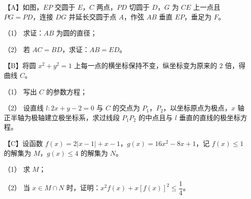\Needspace{0.4\textheight}
\begin{question}
【A】如图，$EP$ 交圆于 $E$，$C$ 两点，$PD$ 切圆于 $D$，$G$ 为 $CE$ 上一点且 $PG=PD$，连接 $DG$ 并延长交圆于点 $A$，作弦 $AB$ 垂直 $EP$，垂足为 $F$。
\nopagebreak[4]
\begin{center}\end{center}
\nopagebreak[4]
（1） 求证：$AB$ 为圆的直径；

（2） 若 $AC=BD$，求证：$AB=ED$。

\end{question}
\begin{question}
【B】将圆 $x^2+y^2=1$ 上每一点的横坐标保持不变，纵坐标变为原来的 $2$ 倍，得曲线 $C$。

（1） 写出 $C$ 的参数方程；

（2） 设直线 $l:2x+y-2=0$ 与 $C$ 的交点为 $P_1$，$P_2$，以坐标原点为极点，$x$ 轴正半轴为极轴建立极坐标系，求过线段 $P_1P_2$ 的中点且与 $l$ 垂直的直线的极坐标方程。

\end{question}
\begin{question}
【C】设函数 $f(x)=2|x-1|+x-1$，$g(x)=16x^2-8x+1$，记 $f(x)\leqslant 1$ 的解集为 $M$，$g(x)\leqslant 4$ 的解集为 $N$。

（1） 求 $M$；

（2） 当 $x\in M\cap N$ 时，证明：$x^2f(x)+x[f(x)]^2\leqslant\dfrac14$。

\end{question}